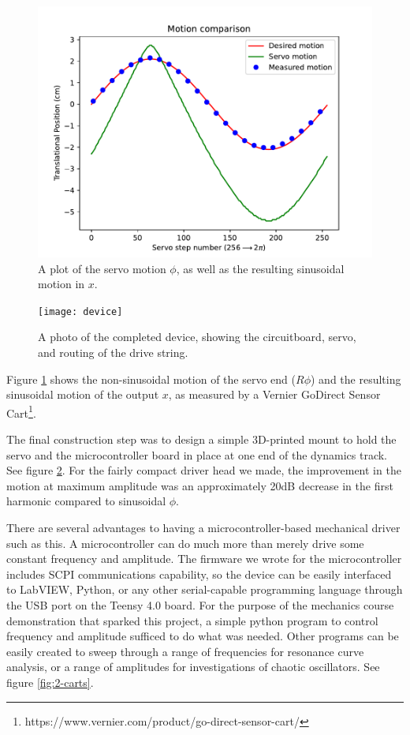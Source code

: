 \documentclass[11 pt]{article}
\begin{document}
\begin{figure}[ht]
	\begin{center}
		\includegraphics{comparison}
	\end{center}
	\caption{A plot of the servo motion $\phi$, as well as the resulting sinusoidal motion in $x$.}
	\label{fig:motion}
\end{figure}

\begin{figure}[ht]
	\begin{center}
		\texttt{[image: device]}
	\end{center}
	\caption{A photo of the completed device, showing the circuitboard, servo, and routing of the drive string.}
	\label{fig:device}
\end{figure}

Figure \ref{fig:motion} shows the non-sinusoidal motion of the servo end ($R\phi$) and the resulting sinusoidal motion of the output $x$, as measured by a Vernier GoDirect Sensor Cart\footnote{https://www.vernier.com/product/go-direct-sensor-cart/}.

The final construction step was to design a simple 3D-printed mount to hold the servo and the microcontroller board in place at one end of the dynamics track. 
See figure \ref{fig:device}.
For the fairly compact driver head we made, the improvement in the motion at maximum amplitude was an approximately 20dB decrease in the first harmonic compared to sinusoidal $\phi$.

There are several advantages to having a microcontroller-based mechanical driver such as this. 
A microcontroller can do much more than merely drive some constant frequency and amplitude. 
The firmware we wrote for the microcontroller includes SCPI communications capability, so the device can be easily interfaced to LabVIEW, Python, or any other serial-capable programming language through the USB port on the Teensy 4.0 board.
For the purpose of the mechanics course demonstration that sparked this project, a simple python program to control frequency and amplitude sufficed to do what was needed. Other programs can be easily created to sweep through a range of frequencies for resonance curve analysis, or a range of amplitudes for investigations of chaotic oscillators. 
See figure \ref{fig:2-carts}.
\end{document}
